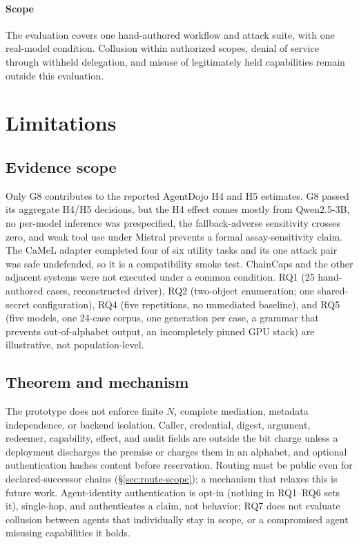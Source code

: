 \documentclass[conference,compsoc]{IEEEtran}
\newcommand{\rev}[1]{#1} %
\begin{document}
\paragraph{Scope} The evaluation covers one hand-authored workflow and attack suite, with one real-model condition. Collusion within authorized scopes, denial of service through withheld delegation, and misuse of legitimately held capabilities remain outside this evaluation.

\section{Limitations}
\label{sec:limitations}


\subsection{Evidence scope}
\rev{Only G8 contributes to the reported AgentDojo H4 and H5 estimates. G8 passed its aggregate H4/H5 decisions, but the H4 effect comes mostly from Qwen2.5-3B, no per-model inference was prespecified, the fallback-adverse sensitivity crosses zero, and weak tool use under Mistral prevents a formal assay-sensitivity claim. The CaMeL adapter completed four of six utility tasks and its one attack pair was safe undefended, so it is a compatibility smoke test. ChainCaps and the other adjacent systems were not executed under a common condition. RQ1 (25 hand-authored cases, reconstructed driver), RQ2 (two-object enumeration; one shared-secret configuration), RQ4 (five repetitions, no unmediated baseline), and RQ5 (five models, one 24-case corpus, one generation per case, a grammar that prevents out-of-alphabet output, an incompletely pinned GPU stack) are illustrative, not population-level.}

\subsection{Theorem and mechanism}
\rev{The prototype does not enforce finite $N$, complete mediation, metadata independence, or backend isolation. Caller, credential, digest, argument, redeemer, capability, effect, and audit fields are outside the bit charge unless a deployment discharges the premise or charges them in an alphabet, and optional authentication hashes content before reservation. Routing must be public even for declared-successor chains (\S\ref{sec:route-scope}); a mechanism that relaxes this is future work. Agent-identity authentication is opt-in (nothing in RQ1--RQ6 sets it), single-hop, and authenticates a claim, not behavior; RQ7 does not evaluate collusion between agents that individually stay in scope, or a compromised agent misusing capabilities it holds.}
\end{document}

